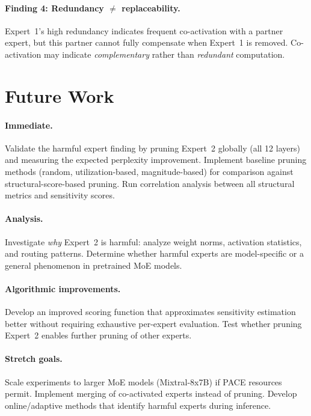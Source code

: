\documentclass{article}
\begin{document}
\paragraph{Finding 4: Redundancy $\neq$ replaceability.}
Expert~1's high redundancy indicates frequent co-activation with a partner expert,
but this partner cannot fully compensate when Expert~1 is removed.
Co-activation may indicate \emph{complementary} rather than \emph{redundant} computation.

\section{Future Work}

\paragraph{Immediate.}
Validate the harmful expert finding by pruning Expert~2 globally (all 12 layers)
and measuring the expected perplexity improvement.
Implement baseline pruning methods (random, utilization-based, magnitude-based)
for comparison against structural-score-based pruning.
Run correlation analysis between all structural metrics and sensitivity scores.

\paragraph{Analysis.}
Investigate \emph{why} Expert~2 is harmful: analyze weight norms, activation
statistics, and routing patterns.
Determine whether harmful experts are model-specific or a general phenomenon
in pretrained MoE models.

\paragraph{Algorithmic improvements.}
Develop an improved scoring function that approximates sensitivity estimation better
without requiring exhaustive per-expert evaluation.
Test whether pruning Expert~2 enables further pruning of other experts.

\paragraph{Stretch goals.}
Scale experiments to larger MoE models (Mixtral-8x7B) if PACE resources permit.
Implement merging of co-activated experts instead of pruning.
Develop online/adaptive methods that identify harmful experts during inference.



\end{document}
